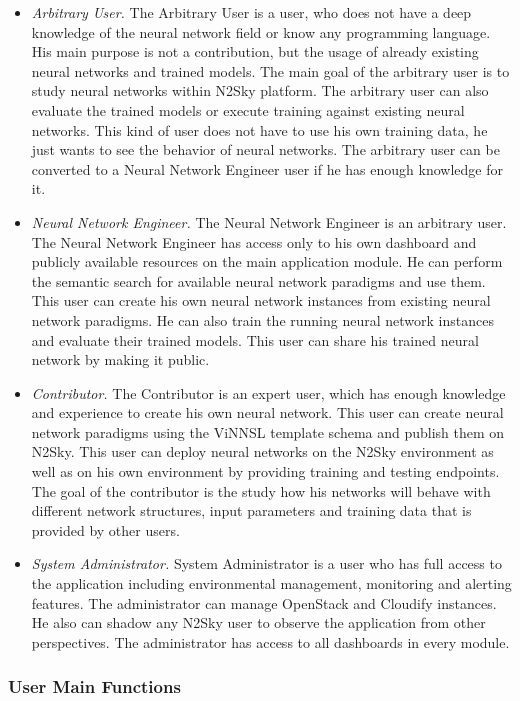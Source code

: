 \begin{itemize}
\item \emph{Arbitrary User.}  The Arbitrary User is a user, who does not have a deep knowledge of the neural network field or know any programming language. His main purpose is not a contribution, but the usage of already existing neural networks and trained models. The main goal of the arbitrary user is to study neural networks within N2Sky platform. The arbitrary user can also evaluate the trained models or execute training against existing neural networks. This kind of user does not have to use his own training data, he just wants to see the behavior of neural networks. The arbitrary user can be converted to a Neural Network Engineer user if he has enough knowledge for it. 
\item \emph{Neural Network Engineer.} The Neural Network Engineer is an arbitrary user. The Neural Network Engineer has access only to his own dashboard and publicly available resources on the main application module. He can perform the semantic search for available neural network paradigms and use them. This user can create his own neural network instances from existing neural network paradigms. He can also train the running neural network instances and evaluate their trained models. This user can share his trained neural network by making it public. 
\item \emph{Contributor.} The Contributor is an expert user, which has enough knowledge and experience to create his own neural network. This user can create neural network paradigms using the ViNNSL template schema and publish them on N2Sky. This user can deploy neural networks on the N2Sky environment as well as on his own environment by providing training and testing endpoints. The goal of the contributor is the study how his networks will behave with different network structures, input parameters and training data that is provided by other users.
\item \emph{System Administrator.} System Administrator is a user who has full access to the application including environmental management, monitoring and alerting features. The administrator can manage OpenStack and Cloudify instances. He also can shadow any N2Sky user to observe the application from other perspectives. The administrator has access to all dashboards in every module.
\end{itemize}


\subsubsection{User Main Functions}\label{User Permissions}

